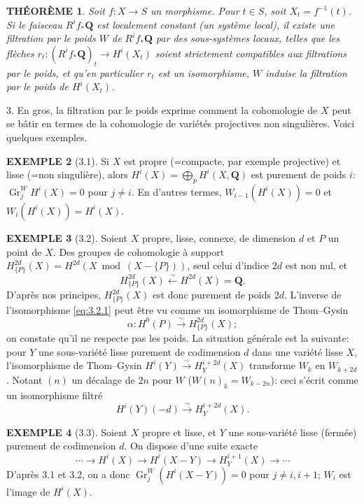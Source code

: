 \documentclass{amsart}
\theoremstyle{plain}
\newtheorem{theorem}{TH\'EOR\`EME}
\theoremstyle{definition}
\newtheorem{example}[theorem]{EXEMPLE}
\theoremstyle{remark}
\DeclareMathOperator{\Gr}{Gr}
\begin{document}
\begin{theorem}
Soit $f: X \to S$ un morphisme. Pour $t \in S$, soit $X_t = f^{-1}(t)$. Si le faisceau $R^i f_* \mathbf{Q}$ est localement constant (un syst\`eme local), il existe une filtration par le poids $W$ de $R^i f_* \mathbf{Q}$ par des sous-syst\`emes locaux, telles que les fl\`eches $r_t: (R^i f_* \mathbf{Q})_t \to H^i(X_t)$ soient strictement compatibles aux filtrations par le poids, et qu'en particulier $r_t$ est un isomorphisme, $W$ induise la filtration par le poids de $H^i(X_t)$.
\end{theorem}

3. En gros, la filtration par le poids exprime comment la cohomologie de $X$ peut se b\^atir en termes de la cohomologie de vari\'et\'es projectives non singuli\`eres. Voici quelques exemples.

\begin{example}[3.1]
Si $X$ est propre (=compacte, par exemple projective) et lisse (=non singuli\`ere), alors $H^i(X) = \bigoplus_p H^i(X, \mathbf{Q})$ est purement de poids $i$: $\Gr_j^W H^i(X) = 0$ pour $j \neq i$. En d'autres termes, $W_{i-1}(H^i(X)) = 0$ et $W_i(H^i(X)) = H^i(X)$.
\end{example}

\begin{example}[3.2]
Soient $X$ propre, lisse, connexe, de dimension $d$ et $P$ un point de $X$. Des groupes de cohomologie \`a support $H_{\{P\}}^{2d}(X) = H^{2d}(X \bmod (X - \{P\}))$, seul celui d'indice $2d$ est non nul, et
\begin{equation}\label{eq:3.2.1}
H_{\{P\}}^{2d}(X) \xleftarrow{\sim} H^{2d}(X) = \mathbf{Q}.
\end{equation}
D'apr\`es nos principes, $H_{\{P\}}^{2d}(X)$ est donc purement de poids $2d$. L'inverse de l'isomorphisme \eqref{eq:3.2.1} peut \^etre vu comme un isomorphisme de Thom--Gysin
\[
\alpha: H^0(P) \xrightarrow{\sim} H_{\{P\}}^{2d}(X);
\]
on constate qu'il ne respecte pas les poids. La situation g\'en\'erale est la suivante: pour $Y$ une sous-vari\'et\'e lisse purement de codimension $d$ dans une vari\'et\'e lisse $X$, l'isomorphisme de Thom--Gysin $H^i(Y) \xrightarrow{\sim} H_Y^{i+2d}(X)$ transforme $W_k$ en $W_{k+2d}$. Notant $(n)$ un d\'ecalage de $2n$ pour $W$ ($W(n)_k = W_{k-2n}$): ceci s'\'ecrit comme un isomorphisme filtr\'e
\[
H^i(Y)(-d) \xrightarrow{\sim} H_Y^{i+2d}(X).
\]
\end{example}

\begin{example}[3.3]
Soient $X$ propre et lisse, et $Y$ une sous-vari\'et\'e lisse (ferm\'ee) purement de codimension $d$. On dispose d'une suite exacte
\[\cdots \to H^i(X) \to H^i(X - Y) \to H_Y^{i+1}(X) \to \cdots\]
D'apr\`es 3.1 et 3.2, on a donc $\Gr_j^W(H^i(X - Y)) = 0$ pour $j \neq i, i+1$; $W_i$ est l'image de $H^i(X)$.
\end{example}
\end{document}
